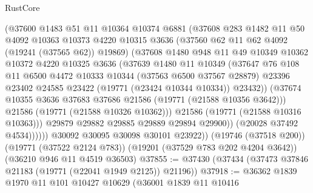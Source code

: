 \begin{lexlean}{RustCore}
\begin{coremodule}
                    (@37600
                      @1483
                      @51
                      @11
                      @10364
                      @10374
                      @6881
                      (@37608
                        @283
                        @1482
                        @11
                        @50
                        @4092
                        @10363
                        @10373
                        @4220
                        @10315
                        @3636
                        (@37560 @62 @11 @62 @4092 (@19241 (@37565 @62)) @19869)
                        (@37608
                          @1480
                          @948
                          @11
                          @49
                          @10349
                          @10362
                          @10372
                          @4220
                          @10325
                          @3636
                          (@37639
                            @1480
                            @11
                            @10349
                            (@37647
                              @76
                              @108
                              @11
                              @6500
                              @4472
                              @10333
                              @10344
                              (@37563 @6500 @37567 @28879)
                              @23396
                              @23402
                              @24585
                              @23422
                              (@19771 (@23424 @10344 @10334))
                              @23432))
                          (@37674 @10355 @3636 @37683 @37686 @21586 (@19771 (@21588 @10356 @3642)))
                          @21586
                          (@19771 (@21588 @10326 @10362)))
                        @21586
                        (@19771 (@21588 @10316 @10363)))
                      @29879
                      @29882
                      @29885
                      @29889
                      @29894
                      @29900))
                  (@20028 @37492 @4534))))))
        @30092
        @30095
        @30098
        @30101
        @23922))
    (@19746 (@37518 @200))
    (@19771 (@37522 @2124 @783))
    (@19201 (@37529 @783 @202 @4204 @3642))
    (@36210 @946 @11 @4519 @36503)
@37855 := @37430 (@37434 (@37473 @37846 @21183 (@19771 (@22041 @1949 @2125)) @21196))
@37918 := @36362
    @1839
    @1970
    @11
    @101
    @10427
    @10629
    (@36001
      @1839
      @11
      @10416

\end{coremodule}
\end{lexlean}
